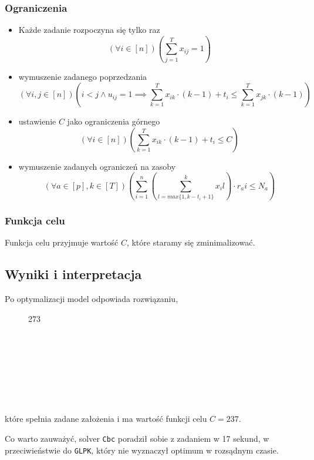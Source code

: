 \documentclass{article}
\begin{document}
\subsubsection{Ograniczenia}
\begin{itemize}
	\item Każde zadanie rozpoczyna się tylko raz
	\[(\forall i \in [n])\left(\sum_{j=1}^{T}{x_{ij}} = 1\right)\]
	\item wymuszenie zadanego poprzedzania
	\[(\forall i,j \in [n])\left(i < j \land u_{ij} = 1 \implies \sum_{k=1}^{T}{x_{ik} \cdot (k-1)} + t_i \leq \sum_{k=1}^{T}{x_{jk} \cdot (k-1)}\right)\]
	\item ustawienie $C$ jako ograniczenia górnego
	\[(\forall i \in [n])\left(\sum_{k=1}^{T}{x_{ik} \cdot (k-1)} + t_i \leq C\right)\]
	\item wymuszenie zadanych ograniczeń na zasoby
	\[(\forall a \in [p], k \in [T])\left(\sum_{i=1}^{n}{\left(\sum_{l=max\{1,k-t_i+1\}}^{k}{x_il}\right)\cdot r_ai} \leq N_a\right)\]
\end{itemize}

\subsubsection{Funkcja celu}
Funkcja celu przyjmuje wartość $C$, które staramy się zminimalizować.

\subsection{Wyniki i interpretacja}
Po optymalizacji model odpowiada rozwiązaniu,

\begin{figure}[H]
	\begin{ganttchart}[bar/.append style={fill=blue!50},expand chart=\textwidth]{0}{273}
	\\
	\\
	\\
	\\
	\\
	\\
	\\
	\\
	\end{ganttchart}
\end{figure}

które spełnia zadane założenia i ma wartość funkcji celu $C = 237$.

Co warto zauważyć, solver \texttt{Cbc} poradził sobie z zadaniem w 17 sekund, w przeciwieństwie do \texttt{GLPK}, który nie wyznaczył optimum w rozsądnym czasie.
\end{document}
